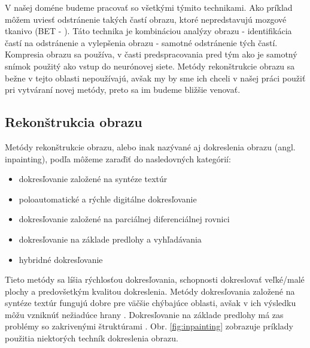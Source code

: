 V našej doméne budeme pracovať so všetkými týmito technikami. Ako príklad môžem uviesť odstránenie takých častí obrazu, ktoré nepredstavujú mozgové tkanivo (BET - \citeauthor*{smith2002fast} \citeyear{smith2002fast}). Táto technika je kombináciou analýzy obrazu - identifikácia častí na odstránenie a vylepšenia obrazu - samotné odstránenie tých častí. Kompresia obrazu sa používa, v časti predspracovania pred tým ako je samotný snímok použitý ako vstup do neurónovej siete. Metódy rekonštrukcie obrazu sa bežne v tejto oblasti nepoužívajú, avšak my by sme ich chceli v našej práci použiť pri vytváraní novej metódy, preto sa im budeme bližšie venovať.

\subsection{Rekonštrukcia obrazu}

Metódy rekonštrukcie obrazu, alebo inak nazývané aj dokreslenia obrazu (angl. inpainting), podľa \citeauthor{6544390} \cite{6544390} môžeme zaraďiť do nasledovných kategórií:
\begin{itemize}
    \item dokresľovanie založené na syntéze textúr
    \item poloautomatické a rýchle digitálne dokresľovanie
    \item dokresľovanie založené na parciálnej diferenciálnej rovnici
    \item dokresľovanie na základe predlohy a vyhľadávania
    \item hybridné dokresľovanie
\end{itemize}

Tieto metódy sa líšia rýchlosťou dokresľovania, schopnosti dokreslovať veľké/malé plochy a predovšetkým kvalitou dokreslenia. Metódy dokresľovania založené na syntéze textúr fungujú dobre pre väčšie chýbajúce oblasti, avšak v ich výsledku môžu vzniknúť nežiadúce hrany \cite{6544390}. Dokresľovanie na základe predlohy má zas problémy so zakrivenými štruktúrami \cite{6544390}. Obr. \ref{fig:inpainting} zobrazuje príklady použitia niektorých techník dokreslenia obrazu.

